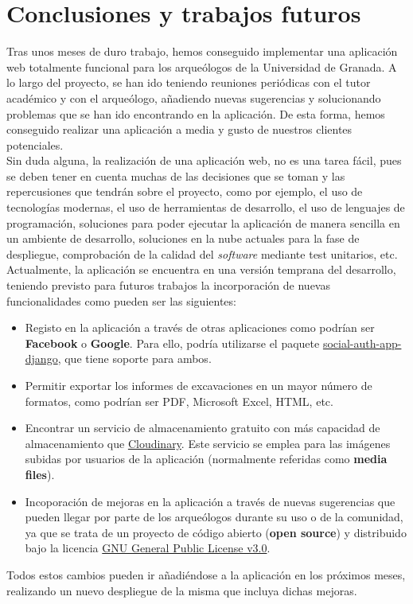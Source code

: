 \chapter{Conclusiones y trabajos futuros}
Tras unos meses de duro trabajo, hemos conseguido implementar una aplicación web totalmente
funcional para los arqueólogos de la Universidad de Granada. A lo largo del proyecto, se han
ido teniendo reuniones periódicas con el tutor académico y con el arqueólogo, añadiendo
nuevas sugerencias y solucionando problemas que se han ido encontrando en la aplicación. De
esta forma, hemos conseguido realizar una aplicación a media y gusto de nuestros clientes
potenciales. \\

Sin duda alguna, la realización de una aplicación web, no es una tarea fácil, pues se deben
tener en cuenta muchas de las decisiones que se toman y las repercusiones que tendrán sobre
el proyecto, como por ejemplo, el uso de tecnologías modernas, el uso de herramientas de
desarrollo, el uso de lenguajes de programación, soluciones para poder ejecutar la aplicación
de manera sencilla en un ambiente de desarrollo, soluciones en la nube actuales para la
fase de despliegue, comprobación de la calidad del \textit{software} mediante test unitarios,
etc. \\

Actualmente, la aplicación se encuentra en una versión temprana del desarrollo, teniendo
previsto para futuros trabajos la incorporación de nuevas funcionalidades como pueden ser
las siguientes:

    \begin{itemize}
        \item Registo en la aplicación a través de otras aplicaciones como podrían ser
        \textbf{Facebook} o \textbf{Google}. Para ello, podría utilizarse el paquete
        \href{https://python-social-auth.readthedocs.io/en/latest/configuration/django.html}
        {social-auth-app-django}, que tiene soporte para ambos.

        \item Permitir exportar los informes de excavaciones en un mayor número de formatos,
        como podrían ser PDF, Microsoft Excel, HTML, etc.

        \item Encontrar un servicio de almacenamiento gratuito con más capacidad de
        almacenamiento que \href{https://cloudinary.com/}{Cloudinary}. Este servicio se
        emplea para las imágenes subidas por usuarios de la aplicación (normalmente
        referidas como \textbf{media files}).

        \item Incoporación de mejoras en la aplicación a través de nuevas sugerencias que
        pueden llegar por parte de los arqueólogos durante su uso o de la comunidad, ya que
        se trata de un proyecto de código abierto (\textbf{open source}) y distribuido bajo
        la licencia \href{https://www.gnu.org/licenses/gpl-3.0.html}{GNU General Public
        License v3.0}.
    \end{itemize}

Todos estos cambios pueden ir añadiéndose a la aplicación en los próximos meses, realizando
un nuevo despliegue de la misma que incluya dichas mejoras.
